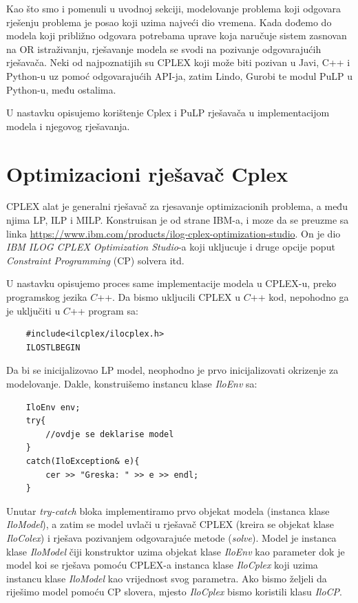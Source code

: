 \documentclass[a4paper, utf8, 11pt, colorlinks]{book}
\begin{document}
 Kao što smo i pomenuli u uvodnoj sekciji, modelovanje problema koji odgovara rješenju problema je 
 posao koji uzima najveći dio vremena. Kada dođemo do modela koji približno odgovara potrebama uprave 
 koja naručuje sistem zasnovan na OR istraživanju, rješavanje modela se svodi na pozivanje odgovarajućih rješavača. Neki od najpoznatijih su 
 CPLEX koji može biti pozivan u Javi, C++ i Python-u uz pomoć odgovarajućih API-ja, zatim Lindo, Gurobi te modul PuLP u Python-u, među ostalima.  
 
 U nastavku opisujemo korištenje Cplex i PuLP rješavača u implementacijom modela i njegovog rješavanja. 
 
 \section{Optimizacioni rješavač Cplex}
 CPLEX alat je generalni rješavač za rjesavanje optimizacionih problema, a među njima  LP, ILP i MILP. Konstruisan je od strane IBM-a, i moze da se preuzme sa linka \url{https://www.ibm.com/products/ilog-cplex-optimization-studio}. On je dio \emph{IBM ILOG CPLEX Optimization Studio}-a koji ukljucuje i druge opcije poput \emph{Constraint Programming} (CP) solvera itd.
 
 U nastavku opisujemo proces same implementacije modela u CPLEX-u, preko programskog jezika $C$++.
 Da bismo ukljucili CPLEX u $C$++ kod, nepohodno ga je uključiti u $C$++ program sa:
 \begin{verbatim}
 	#include<ilcplex/ilocplex.h>
 	ILOSTLBEGIN
 \end{verbatim}
 Da bi se inicijalizovao LP model, neophodno je prvo inicijalizovati okrizenje za modelovanje. Dakle, konstruišemo instancu klase \emph{IloEnv} sa: 
 \begin{verbatim}
 	IloEnv env;
 	try{
 		//ovdje se deklarise model
 	}
 	catch(IloException& e){
 		cer >> "Greska: " >> e >> endl;
 	}
 \end{verbatim}
 
 \noindent Unutar \emph{try-catch} bloka implementiramo prvo objekat modela (instanca klase \emph{IloModel}), a zatim se model uvlači u rješavač CPLEX (kreira se objekat klase \emph{IloColex}) i rješava pozivanjem odgovarajuće metode (\emph{solve}).
 Model je instanca klase \emph{IloModel} čiji konstruktor uzima objekat klase \emph{IloEnv} kao parameter dok je model koi se rješava pomoću CPLEX-a instanca klase \emph{IloCplex} koji uzima instancu klase \emph{IloModel} kao vrijednost svog parametra.  Ako bismo željeli da riješimo model pomoću CP slovera, mjesto \emph{IloCplex} bismo koristili klasu \emph{IloCP}. 
 
\end{document}
